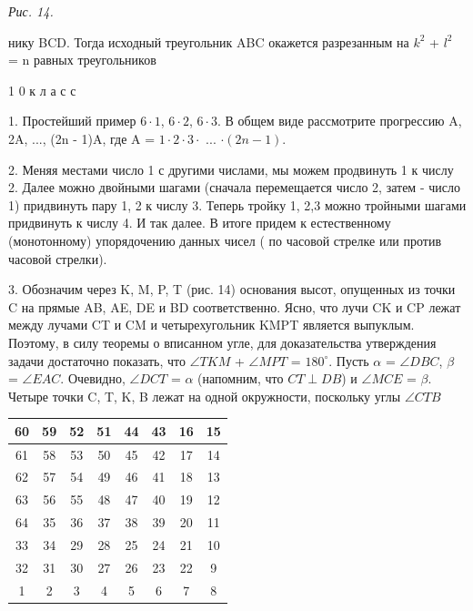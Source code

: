 \setlength\parindent{0pt}
\setcounter{page}{75} 
\begin{figure}[bh]
   	\noindent{}
\end{figure}
\textit{Рис. 14.}
\vspace*{8pt}

нику BCD. Тогда исходный треугольник ABC окажется разрезанным на $k^2$ + $l^2$ = n равных треугольников

1 0 к л а с с

1. Простейший пример $6\cdot1$,  $6\cdot2$,  $6\cdot3$. В общем виде рассмотрите прогрессию A, 2A, ..., (2n - 1)A, где A = $1 \cdot 2 \cdot 3 \cdot$ ... $\cdot (2n - 1)$.

2. Меняя местами число 1 с другими числами, мы можем продвинуть 1 к числу 2. Далее можно двойными шагами (сначала перемещается число 2, затем - число 1) придвинуть пару 1, 2 к числу 3. Теперь тройку 1, 2,3 можно тройными шагами придвинуть к числу 4. И так далее. В итоге придем к естественному (монотонному) упорядочению данных чисел ( по часовой стрелке или против часовой стрелки).

3. Обозначим через K, M, P, T (рис. 14) основания высот, опущенных из точки C на прямые AB, AE, DE и BD соответственно. Ясно, что лучи CK и CP лежат между лучами CT и CM и четырехугольник KMPT является выпуклым. Поэтому, в силу теоремы о вписанном угле, для доказательства утверждения задачи достаточно показать, что $\angle TKM$ + $\angle MPT$ = $180^{\circ}$. Пусть $\alpha$ = $\angle DBC$, $\beta$ = $\angle EAC$. Очевидно, $\angle DCT$ = $\alpha$ (напомним, что $CT \perp DB$) и $\angle MCE$ = $\beta$. Четыре точки C, T, K, B лежат на одной окружности, поскольку углы $\angle CTB$

\begin{table}[h]
    \centering
    \begin{tabular}{|c|c|c|c|c|c|c|c|}
\hline
60 & 59 & 52 & 51 & 44 & 43 & 16 & 15 \\ \hline
61 & 58 & 53 & 50 & 45 & 42 & 17 & 14 \\ \hline
62 & 57 & 54 & 49 & 46 & 41 & 18 & 13 \\ \hline
63 & 56 & 55 & 48 & 47 & 40 & 19 & 12 \\ \hline
64 & 35 & 36 & 37 & 38 & 39 & 20 & 11 \\ \hline
33 & 34 & 29 & 28 & 25 & 24 & 21 & 10 \\ \hline
32 & 31 & 30 & 27 & 26 & 23 & 22 & 9  \\ \hline
1  & 2  & 3  & 4  & 5  & 6  & 7  & 8  \\ \hline
\end{tabular}
\end{table}

